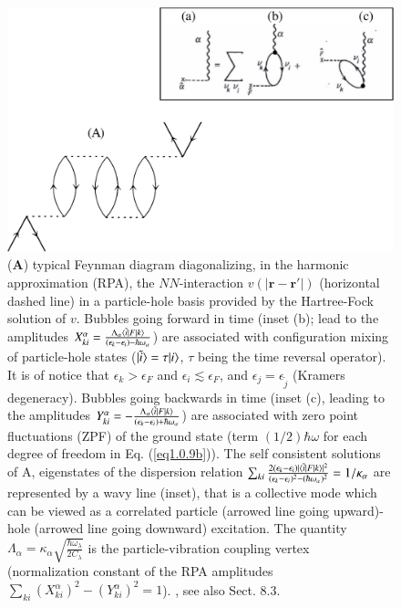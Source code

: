\begin{figure}
	\centerline {
		\includegraphics*[width=12cm]{introduccion/figs/figpreface7}
	}
	\caption{(\textbf{A}) typical Feynman diagram diagonalizing, in the harmonic approximation (RPA), the $NN$-interaction $v(|\mathbf r-\mathbf r'|)$ (horizontal dashed line) in a particle-hole basis provided by the Hartree-Fock solution of $v$. Bubbles going forward in time (inset (b); lead to the amplitudes $X^\alpha_{ki}=\frac{\Lambda_\alpha\langle {\tilde i|F|k} \rangle}{(\epsilon_k-\epsilon_i)-\hbar\omega_\alpha}$) are associated with configuration mixing of particle-hole states  ($|{\tilde i} \rangle=\tau|{i} \rangle$,  $\tau$ being the time reversal operator). It is of notice that $\epsilon_k>\epsilon_F$ and $\epsilon_i\lesssim\epsilon_F$, and $\epsilon_j=\epsilon_{\widetilde j}$ (Kramers degeneracy). Bubbles going backwards in time (inset (c), leading to the amplitudes $Y^\alpha_{ki}=-\frac{\Lambda_\alpha\langle {\tilde i|F|k} \rangle}{(\epsilon_k-\epsilon_i)+\hbar\omega_\alpha}$) are associated with zero point  fluctuations (ZPF) of the ground state (term $(1/2)\hbar\omega$ for each degree of freedom in Eq. (\ref{eq1.0.9b})). The self consistent solutions of A, eigenstates of the dispersion relation $\sum_{ki}\frac{2(\epsilon_k-\epsilon_i)|\langle {\tilde i|F|k} \rangle|^2}{(\epsilon_k-\epsilon_i)^2-(\hbar\omega_\alpha)^2}=1/\kappa_\alpha$ are represented by a wavy line (inset), that is a collective mode which can be viewed as a correlated particle (arrowed line going upward)- hole (arrowed line going downward) excitation. The quantity $\Lambda_\alpha=\kappa_\alpha\sqrt{\frac{\hbar\omega_\lambda}{2C_\lambda}}$ is the particle-vibration coupling vertex (normalization constant of the RPA amplitudes $\sum_{ki}\left(X^\alpha_{ki}\right)^2-\left(Y^\alpha_{ki}\right)^2=1$). \cite{Bohm:51,Bohm:53}, see also \cite{Brink:05} Sect. 8.3.}
	\label{fig1.0.7}
\end{figure}

